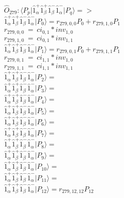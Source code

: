 \documentclass[14pt]{article}
\begin{document}
    $\hat{O}_{279}:  \langle{P_p}\vert \hat{1}_{\alpha}^{+}\hat{1}_{\beta}^{+}\hat{1}_{\beta}^{-}\hat{1}_{\alpha}^{-} \vert{P_q}\rangle => $ \\ 
    $ \hat{1}_{\alpha}^{+}\hat{1}_{\beta}^{+}\hat{1}_{\beta}^{-}\hat{1}_{\alpha}^{-} \vert{P_{0}}\rangle = {r}_{279,0,0}P_{0}+{r}_{279,1,0}P_{1} $ \\ 
    ${r}_{279,0,0}\ =\ {ci}_{0,1}*{inv}_{1,0} $ \\ 
    ${r}_{279,1,0}\ =\ {ci}_{0,1}*{inv}_{1,1} $ \\ 
    $ \hat{1}_{\alpha}^{+}\hat{1}_{\beta}^{+}\hat{1}_{\beta}^{-}\hat{1}_{\alpha}^{-} \vert{P_{1}}\rangle = {r}_{279,0,1}P_{0}+{r}_{279,1,1}P_{1} $ \\ 
    ${r}_{279,0,1}\ =\ {ci}_{1,1}*{inv}_{1,0} $ \\ 
    ${r}_{279,1,1}\ =\ {ci}_{1,1}*{inv}_{1,1} $ \\ 
    $ \hat{1}_{\alpha}^{+}\hat{1}_{\beta}^{+}\hat{1}_{\beta}^{-}\hat{1}_{\alpha}^{-} \vert{P_{2}}\rangle =  $ \\ 
    $ \hat{1}_{\alpha}^{+}\hat{1}_{\beta}^{+}\hat{1}_{\beta}^{-}\hat{1}_{\alpha}^{-} \vert{P_{3}}\rangle =  $ \\ 
    $ \hat{1}_{\alpha}^{+}\hat{1}_{\beta}^{+}\hat{1}_{\beta}^{-}\hat{1}_{\alpha}^{-} \vert{P_{4}}\rangle =  $ \\ 
    $ \hat{1}_{\alpha}^{+}\hat{1}_{\beta}^{+}\hat{1}_{\beta}^{-}\hat{1}_{\alpha}^{-} \vert{P_{5}}\rangle =  $ \\ 
    $ \hat{1}_{\alpha}^{+}\hat{1}_{\beta}^{+}\hat{1}_{\beta}^{-}\hat{1}_{\alpha}^{-} \vert{P_{6}}\rangle =  $ \\ 
    $ \hat{1}_{\alpha}^{+}\hat{1}_{\beta}^{+}\hat{1}_{\beta}^{-}\hat{1}_{\alpha}^{-} \vert{P_{7}}\rangle =  $ \\ 
    $ \hat{1}_{\alpha}^{+}\hat{1}_{\beta}^{+}\hat{1}_{\beta}^{-}\hat{1}_{\alpha}^{-} \vert{P_{8}}\rangle =  $ \\ 
    $ \hat{1}_{\alpha}^{+}\hat{1}_{\beta}^{+}\hat{1}_{\beta}^{-}\hat{1}_{\alpha}^{-} \vert{P_{9}}\rangle =  $ \\ 
    $ \hat{1}_{\alpha}^{+}\hat{1}_{\beta}^{+}\hat{1}_{\beta}^{-}\hat{1}_{\alpha}^{-} \vert{P_{10}}\rangle =  $ \\ 
    $ \hat{1}_{\alpha}^{+}\hat{1}_{\beta}^{+}\hat{1}_{\beta}^{-}\hat{1}_{\alpha}^{-} \vert{P_{11}}\rangle =  $ \\ 
    $ \hat{1}_{\alpha}^{+}\hat{1}_{\beta}^{+}\hat{1}_{\beta}^{-}\hat{1}_{\alpha}^{-} \vert{P_{12}}\rangle = {r}_{279,12,12}P_{12} $ \\ 
\end{document}
